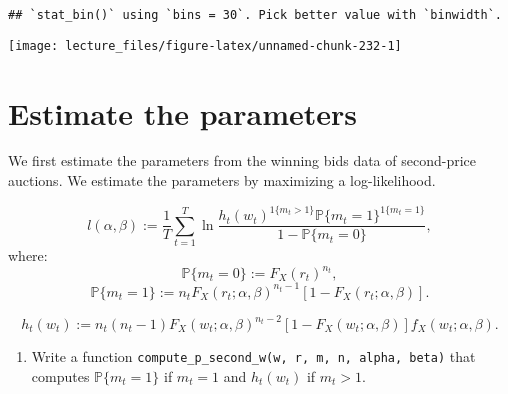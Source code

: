 \documentclass[
]{book}
\newenvironment{Shaded}{\begin{snugshade}}{\end{snugshade}}
\newcommand{\AttributeTok}[1]{\textcolor[rgb]{0.13,0.29,0.53}{#1}}
\newcommand{\CommentTok}[1]{\textcolor[rgb]{0.56,0.35,0.01}{\textit{#1}}}
\newcommand{\DecValTok}[1]{\textcolor[rgb]{0.00,0.00,0.81}{#1}}
\newcommand{\FunctionTok}[1]{\textcolor[rgb]{0.13,0.29,0.53}{\textbf{#1}}}
\newcommand{\NormalTok}[1]{#1}
\newcommand{\OtherTok}[1]{\textcolor[rgb]{0.56,0.35,0.01}{#1}}
\newcommand{\SpecialCharTok}[1]{\textcolor[rgb]{0.81,0.36,0.00}{\textbf{#1}}}
\providecommand{\tightlist}{%
  \setlength{\itemsep}{0pt}\setlength{\parskip}{0pt}}
\begin{document}
\begin{verbatim}
## `stat_bin()` using `bins = 30`. Pick better value with `binwidth`.
\end{verbatim}

\begin{center}\texttt{[image: lecture\_files/figure-latex/unnamed-chunk-232-1]} \end{center}

\hypertarget{estimate-the-parameters-5}{%
\section{Estimate the parameters}\label{estimate-the-parameters-5}}

We first estimate the parameters from the winning bids data of second-price auctions. We estimate the parameters by maximizing a log-likelihood.

\[
l(\alpha, \beta) := \frac{1}{T} \sum_{t = 1}^T \ln\frac{h_t(w_t)^{1\{m_t > 1\}} \mathbb{P}\{m_t = 1\}^{1\{m_t = 1\}}}{1 - \mathbb{P}\{m_t = 0\}},
\]
where:
\[
\mathbb{P}\{m_t = 0\} := F_X(r_t)^{n_t},
\]
\[
\mathbb{P}\{m_t = 1\} := n_t F_X(r_t; \alpha, \beta)^{n_t - 1} [1 - F_X(r_t; \alpha, \beta)].
\]

\[
h_t(w_t) := n_t (n_t - 1) F_X(w_t; \alpha, \beta)^{n_t - 2} [1 - F_X(w_t; \alpha, \beta)] f_X(w_t; \alpha, \beta).
\]

\begin{enumerate}
\def\labelenumi{\arabic{enumi}.}
\tightlist
\item
  Write a function \texttt{compute\_p\_second\_w(w,\ r,\ m,\ n,\ alpha,\ beta)} that computes \(\mathbb{P}\{m_t = 1\}\) if \(m_t = 1\) and \(h_t(w_t)\) if \(m_t > 1\).
\end{enumerate}

\begin{Shaded}
\end{Shaded}
\end{document}
